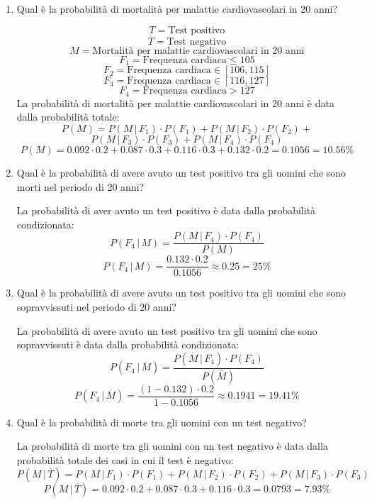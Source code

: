 \documentclass[a4paper]{article}
\theoremstyle{break}
\theoremstyle{break}
\theoremstyle{break}
\theoremstyle{break}
\begin{document}
\begin{enumerate}
  \item Qual è la probabilità di mortalità per malattie cardiovascolari in 20 anni?

    \vspace{1em}
    \[
      T = \text{Test positivo}
    \] 
    \[
      \overline{T} = \text{Test negativo}
    \] 
    \[
      M = \text{Mortalità per malattie cardiovascolari in 20 anni}
    \] 
    \[
      F_1 = \text{Frequenza cardiaca} \le 105
    \] 
    \[
      F_2 = \text{Frequenza cardiaca} \in [106, 115]
    \] 
    \[
      F_3 = \text{Frequenza cardiaca} \in [116, 127]
    \] 
    \[
      F_4 = \text{Frequenza cardiaca} > 127
    \] 
    La probabilità di mortalità per malattie cardiovascolari in 20 anni è data dalla probabilità
    totale:
    \[
      P(M) = P(M\,|\,F_1) \cdot P(F_1) + P(M\,|\,F_2) \cdot P(F_2) + 
    \] 
    \[
      P(M\,|\,F_3) \cdot P(F_3) + P(M\,|\,F_4) \cdot P(F_4)
    \] 
    \[
      P(M) = 0.092 \cdot 0.2 + 0.087 \cdot 0.3 + 0.116 \cdot 0.3 + 0.132 \cdot 0.2 = 0.1056 = 10.56\%
    \] 
  \item Qual è la probabilità di avere avuto un test positivo tra gli uomini che sono 
    morti nel periodo di 20 anni?

    \vspace{1em}
    La probabilità di aver avuto un test positivo è data dalla probabilità condizionata:
    \[
      P(F_4\,|\,M) = \frac{P(M\,|\,F_4) \cdot P(F_4)}{P(M)}
    \]
    \[
      P(F_4\,|\,M) = \frac{0.132 \cdot 0.2}{0.1056} \approx 0.25 = 25\%
    \] 
  \item Qual è la probabilità di avere avuto un test positivo tra gli uomini che sono 
    sopravvissuti nel periodo di 20 anni?

    \vspace{1em}
    La probabilità di avere avuto un test positivo tra gli uomini che sono sopravvissuti
    è data dalla probabilità condizionata:
    \[
      P(F_4\,|\,\overline{M}) = \frac{P(\overline{M}\,|\,F_4) \cdot P(F_4)}{P(\overline{M})}
    \]
    \[
      P(F_4\,|\, \overline{M}) = \frac{(1-0.132) \cdot 0.2}{1-0.1056} \approx 0.1941 = 19.41\%
    \] 
  \item Qual è la probabilità di morte tra gli uomini con un test negativo?

    \vspace{1em}
    La probabilità di morte tra gli uomini con un test negativo è data dalla probabilità
    totale dei casi in cui il test è negativo:
    \[
      P(M\,|\,\overline{T}) = P(M\,|\,F_1) \cdot P(F_1) + P(M\,|\,F_2) \cdot P(F_2) +P(M\,|\,F_3) \cdot P(F_3)
    \]
    \[
      P(M\,|\,\overline{T}) = 0.092 \cdot 0.2 + 0.087 \cdot 0.3 + 0.116 \cdot 0.3 = 0.0793 = 7.93\%
    \] 
\end{enumerate}
\end{document}
